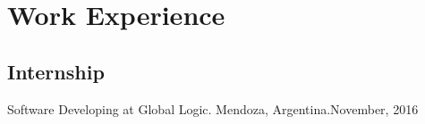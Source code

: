 \section{Work Experie\textcolor{mycolor}{nce}}
  \subsection{Internship}
    Software Developing at {\textcolor{mycolor}{Global Logic}}. Mendoza, Argentina.{\textcolor{mygrey}{\hspace*{\fill}November, 2016}}
